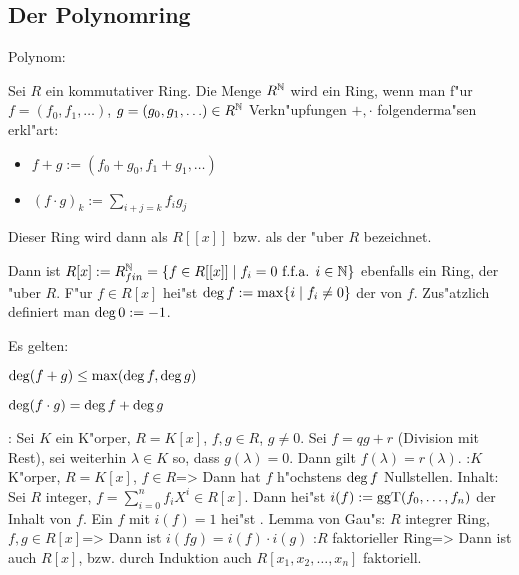 \subsection{Der Polynomring}
 Polynom:{
  Sei $R$ ein kommutativer Ring. Die Menge $R^\mathbb N$ wird ein Ring, wenn man
  f"ur $f=(f_0,f_1,\ldots)$, $g=(g_0,g_1,\ldots)\in R^\mathbb N$ Verkn"upfungen 
  $+,\cdot$ folgenderma"sen erkl"art:
  \begin{itemize}
    \item $f+g:=(f_0+g_0,f_1+g_1,\ldots)$
    \item $(f\cdot g)_k:=\sum_{i+j=k} f_ig_j$
    \end{itemize}
  Dieser Ring wird dann als $R[[x]]$ bzw. als der 
  "uber $R$ bezeichnet.
  
  Dann ist $R[x]:=R^\mathbb N_{fin}=\{f\in R[[x]]\mid f_i=0 \text{ f.f.a. } i\in\mathbb N\}$ 
  ebenfalls ein Ring, der  "uber $R$. F"ur $f\in R[x]$
  hei"st $\operatorname{deg} f:=\max\{i\mid f_i\ne0\}$ der  von $f$.
   Zus"atzlich definiert man $\operatorname{deg} 0:=-1$.
  
  Es gelten:
  \begin{stmts}
    \item $\operatorname{deg} (f+g)\le \max(\operatorname{deg} f,\operatorname{deg} g)$
    \item $\operatorname{deg} (f\cdot g)=\operatorname{deg} f+\operatorname{deg} g$
    \end{stmts}
  }
\remark:{
  Sei $K$ ein K"orper, $R=K[x]$, $f,g\in R$, $g\ne 0$.
  Sei $f=qg+r$ (Division mit Rest), sei weiterhin $\lambda\in K$ so, dass
  $g(\lambda)=0$. Dann gilt $f(\lambda)=r(\lambda)$.
  }
\corollary:$K$ K"orper, $R=K[x]$, $f\in R$=>{
  Dann hat $f$ h"ochstens $\operatorname{deg} f$ Nullstellen.
  }
 Inhalt:{
  Sei $R$ integer, $f=\sum_{i=0}^n f_iX^i\in R[x]$.
  Dann hei"st $i(f):=\operatorname{ggT}(f_0,\ldots,f_n)$ der Inhalt von $f$.
  Ein $f$ mit $i(f)=1$ hei"st .
  }
\theorem Lemma von Gau"s:
  $R$ integrer Ring, $f,g\in R[x]$=>{
  Dann ist $i(fg)=i(f)\cdot i(g)$
  }
\theorem:$R$ faktorieller Ring=>{
  Dann ist auch $R[x]$, bzw. durch Induktion auch $R[x_1,x_2,\ldots,x_n]$
  faktoriell.
  }
